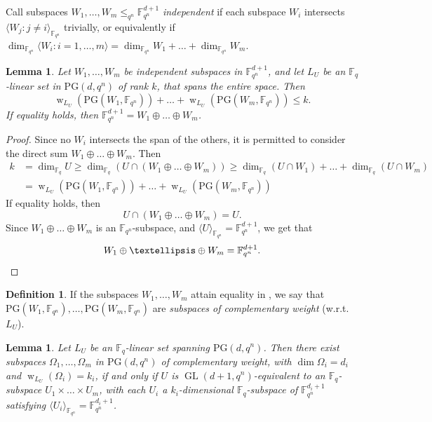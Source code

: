 \documentclass[11pt]{article}
\newtheorem{lemma}[theorem]{Lemma}
\theoremstyle{definition}
\newtheorem{definition}[theorem]{Definition}
\newcommand{\fqn}{\mathbb{F}_{q^n}}
\newcommand{\fq}{{\mathbb F}_{q}}
\newcommand{\PG}{\mathrm{PG}}
\newcommand{\pg}{\PG}
\DeclareMathOperator{\ww}{w}
\DeclareMathOperator{\GL}{GL}
\begin{document}
Call subspaces $W_1, \dots, W_m \leq_{q^n} \fqn^{d+1}$ \emph{independent} if each subspace $W_i$ intersects $\langle W_j : j \neq i \rangle_{\fqn}$ trivially, or equivalently if $\dim_{\fqn} \langle W_i : i=1, \dots, m \rangle = \dim_{\fqn} W_1 + \ldots + \dim_{\fqn} W_m$.

\begin{lemma}
 \label{lm:IndependentSubspaces}
 Let $W_1, \dots, W_m$ be independent subspaces in $\fqn^{d+1}$, and let $L_U$ be an $\fq$-linear set in $\PG(d,q^n)$ of rank $k$, that spans the entire space.
 Then
 \[
  \ww_{L_U}( \pg(W_1,\fqn)) + \ldots + \ww_{L_U}(\pg(W_m,\fqn)) \leq k.
 \]
 If equality holds, then $\fqn^{d+1} = W_1 \oplus \ldots \oplus W_m$.
\end{lemma}

\begin{proof}
Since no $W_i$ intersects the span of the others, it is permitted to consider the direct sum $W_1 \oplus \ldots \oplus W_m$.
Then
\begin{align*}
 k &= \dim_{\fq} U
 \geq \dim_{\fq} (U \cap (W_1 \oplus \ldots \oplus W_m))
 \geq \dim_{\fq} (U \cap W_1) + \ldots + \dim_{\fq} (U \cap W_m) \\
 &= \ww_{L_U}(\PG(W_1,\fqn)) + \ldots + \ww_{L_U}(\PG(W_m,\fqn))
\end{align*}
If equality holds, then
\[
 U \cap (W_1 \oplus \ldots \oplus W_m) = U.
\]
Since $W_1 \oplus \ldots \oplus W_m$ is an $\fqn$-subspace, and $\langle U \rangle_{\fqn} = \fqn^{d+1}$, we get that
\[
 W_1 \oplus \ldots \oplus W_m = \fqn^{d+1}. \qedhere
\]
\end{proof}

\begin{definition}
 If the subspaces $W_1, \dots, W_m$ attain equality in , we say that $\pg(W_1,\fqn),\dots,\pg(W_m,\fqn)$ are \emph{subspaces of complementary weight} (w.r.t.\ $L_U$).
\end{definition}

\begin{lemma}
 Let $L_U$ be an $\fq$-linear set spanning $\PG(d,q^n)$.
 Then there exist subspaces $\Omega_1, \dots, \Omega_m$ in $\PG(d,q^n)$  of complementary weight, with $\dim \Omega_i = d_i$ and $\ww_{L_U}(\Omega_i) = k_i$, if and only if $U$ is $\GL(d+1,q^n)$-equivalent to an $\fq$-subspace $U_1 \times \ldots \times U_m$, with each $U_i$ a $k_i$-dimensional $\fq$-subspace of $\fqn^{d_i+1}$ satisfying $\langle U_i \rangle_{\fqn} = \fqn^{d_i+1}$.
\end{lemma}
\end{document}
